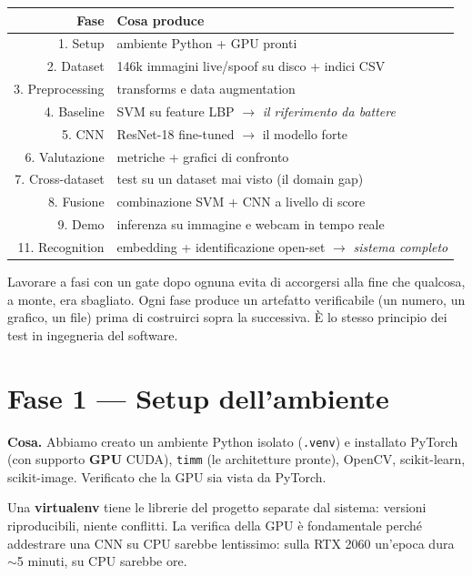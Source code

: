 \documentclass[11pt,a4paper]{article}
\newcommand{\acr}[1]{\textbf{#1}}
\begin{document}
\begin{center}
\small
\begin{tabular}{@{}rl@{}}
\toprule
\textbf{Fase} & \textbf{Cosa produce} \\
\midrule
1. Setup        & ambiente Python + GPU pronti \\
2. Dataset      & 146k immagini live/spoof su disco + indici CSV \\
3. Preprocessing & transforms e data augmentation \\
4. Baseline     & SVM su feature LBP $\rightarrow$ \emph{il riferimento da battere} \\
5. CNN          & ResNet-18 fine-tuned $\rightarrow$ il modello forte \\
6. Valutazione  & metriche + grafici di confronto \\
7. Cross-dataset & test su un dataset mai visto (il domain gap) \\
8. Fusione      & combinazione SVM + CNN a livello di score \\
9. Demo         & inferenza su immagine e webcam in tempo reale \\
11. Recognition & embedding + identificazione open-set $\rightarrow$ \emph{sistema completo} \\
\bottomrule
\end{tabular}
\end{center}

\begin{perchebox}
Lavorare a fasi con un gate dopo ognuna evita di accorgersi alla fine che qualcosa, a monte,
era sbagliato. Ogni fase produce un artefatto verificabile (un numero, un grafico, un file)
prima di costruirci sopra la successiva. \`E lo stesso principio dei test in ingegneria del software.
\end{perchebox}

\section{Fase 1 --- Setup dell'ambiente}
\textbf{Cosa.} Abbiamo creato un ambiente Python isolato (\texttt{.venv}) e installato PyTorch
(con supporto \acr{GPU} CUDA), \texttt{timm} (le architetture pronte), OpenCV, scikit-learn,
scikit-image. Verificato che la GPU sia vista da PyTorch.

\begin{perchebox}
Una \textbf{virtualenv} tiene le librerie del progetto separate dal sistema: versioni
riproducibili, niente conflitti. La verifica della GPU \`e fondamentale perch\'e addestrare una
CNN su CPU sarebbe lentissimo: sulla RTX 2060 un'epoca dura $\sim$5 minuti, su CPU sarebbe ore.
\end{perchebox}
\end{document}
